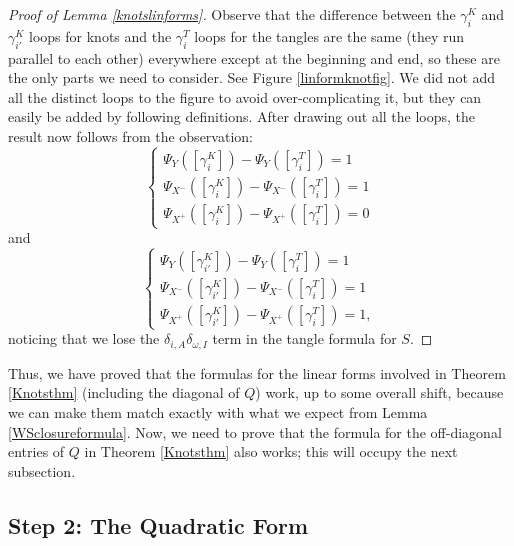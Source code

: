 \documentclass[11pt]{amsart}
\theoremstyle{plain}
\theoremstyle{definition}
\theoremstyle{remark}
\begin{document}
\begin{proof}[Proof of Lemma \ref{knotslinforms}]
    Observe that the difference between the $\gamma^K_i$ and $\gamma^K_{i'}$ loops for knots and the $\gamma^T_i$ loops for the tangles are the same (they run parallel to each other) everywhere except at the beginning and end, so these are the only parts we need to consider. See Figure \ref{linformknotfig}. We did not add all the distinct loops to the figure to avoid over-complicating it, but they can easily be added by following definitions. After drawing out all the loops, the result now follows from the observation:
\[
     \begin{cases}
        \Psi_Y([\gamma^K_i])-\Psi_Y([\gamma^T_i])=1\\
        \Psi_{X^-}([\gamma^K_i])-\Psi_{X^-}([\gamma^T_i])=1 \\
        \Psi_{X^+}([\gamma^K_i])-\Psi_{X^+}([\gamma^T_i])=0
    \end{cases}
\]
    and
\[
    \begin{cases}
        \Psi_Y([\gamma^K_{i'}])-\Psi_Y([\gamma^T_i])=1\\
        \Psi_{X^-}([\gamma^K_{i'}])-\Psi_{X^-}([\gamma^T_i])=1 \\
        \Psi_{X^+}([\gamma^K_{i'}])-\Psi_{X^+}([\gamma^T_i])=1,
    \end{cases}
\]
    noticing that we lose the $\delta_{i,A}\delta_{\omega,I}$ term in the tangle formula for $S$.
\end{proof}

Thus, we have proved that the formulas for the linear forms involved in Theorem \ref{Knotsthm} (including the diagonal of $Q$) work, up to some overall shift, because we can make them match exactly with what we expect from Lemma \ref{WSclosureformula}. Now, we need to prove that the formula for the off-diagonal entries of $Q$ in Theorem \ref{Knotsthm} also works; this will occupy the next subsection.


\subsection{Step 2: The Quadratic Form}
\label{Knotquadformsec}
\end{document}
